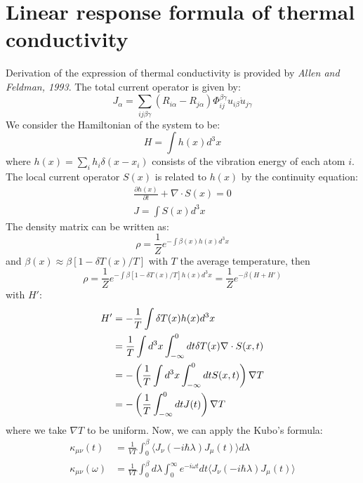 \documentclass{article}
\begin{document}
\section{Linear response formula of thermal conductivity}
Derivation of the expression of thermal conductivity is provided by \emph{Allen and Feldman, 1993}. 
The total current operator is given by:
\begin{equation}
    J_{\alpha} = \sum_{ij\beta\gamma} (R_{i\alpha} - R_{j\alpha}) \Phi_{ij}^{\beta\gamma} u_{i\beta} \dot{u}_{j\gamma}
\end{equation}
We consider the Hamiltonian of the system to be:
\begin{equation}
    H = \int h(x)  d^3x
\end{equation}
where $h(x) = \sum_i h_i \delta(x - x_i)$ consists of the vibration energy of each atom $i$. 
The local current operator $S(x)$ is related to $h(x)$ by the continuity equation:
\begin{gather}
    \frac{\partial h(x)}{\partial t} + \nabla\cdot S(x) = 0 \\
    J = \int S(x) d^3x
\end{gather}
The density matrix can be written as:
\begin{equation}
    \rho = \frac{1}{Z} e^{- \int \beta(x) h(x) d^3x}
\end{equation}
and $\beta(x) \approx \beta[1-\delta T(x)/T]$ with $T$ the average temperature, then
\begin{equation}
    \rho = \frac{1}{Z} e^{- \int \beta[1-\delta T(x)/T] h(x) d^3x} = \frac{1}{Z} e^{- \beta (H + H')}
\end{equation}
with $H'$:
\begin{align}
    H' &= -\frac{1}{T} \int \delta T(x)h(x) d^3x \notag \\
        & = \frac{1}{T} \int d^3x \int _{-\infty}^{0} dt \delta T(x) \nabla\cdot S(x,t) \notag \\
        & = - \left( \frac{1}{T} \int d^3x \int _{-\infty}^{0} dt S(x,t) \right) \nabla T \notag \\
        & = - \left( \frac{1}{T} \int _{-\infty}^{0} dt J(t) \right) \nabla T 
\end{align}
where we take $\nabla T$ to be uniform. Now, we can apply the Kubo's formula:
\begin{align}
    \kappa_{\mu\nu} (t) & = \frac{1}{VT} \int_0^{\beta} \langle J_{\nu}(-i\hbar\lambda) J_{\mu}(t) \rangle d\lambda \\
    \kappa_{\mu\nu} (\omega) & = \frac{1}{VT} \int_0^{\beta} d\lambda \int_{0}^{\infty} e^{-i\omega t} dt \langle J_{\nu}(-i\hbar\lambda) J_{\mu}(t) \rangle 
\end{align}
\end{document}
